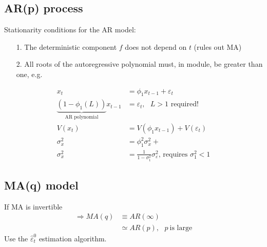 \begin{multicols}{2}
 \subsection{AR(p) process}\noindent
 Stationarity conditions for the AR model:
 \begin{itemize}
  \item[1.] The deterministic component $f$ does not depend on $t$ (rules out MA)
  \item[2.] All roots of the autoregressive polynomial must, in module, be greater than one, e.g.\\
 \end{itemize}
 \begin{align*}
  x_t                                                     & =\phi_1x_{t-1}+\varepsilon_t                                                  \\
  \underbrace{(1-\phi_1 (L))}_\text{AR polynomial}x_{t-1} & =\varepsilon_t,\ \ \ L>1\textrm{ required!}                                   \\
  V(x_t)                                                  & =V(\phi_1x_{t-1})+V(\varepsilon_t)                                            \\
  \sigma^2_x                                              & =\phi_1^2 \sigma_x^2 +                                                        \\
  \sigma_x^2                                              & =\frac{1}{1-\sigma_1^2}\sigma^2_\varepsilon\textrm{,   requires }\sigma^2_1<1
 \end{align*}


 \subsection{MA(q) model}\noindent
 If MA is invertible
 \begin{align*}
  \Rightarrow MA(q) & \equiv AR(\infty)                       \\
                    & \simeq AR(p),\ \ \ p\ \textrm{is large}
 \end{align*}
 Use the $\hat{\varepsilon}_t^0$ estimation algorithm.

\end{multicols}



